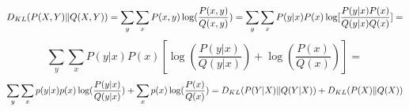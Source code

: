 \begin{answer}
$$ D_{KL}(P(X,Y)\|Q(X,Y)) = \sum_y \sum_x P(x,y) \log(\frac{P(x,y)}{Q(x,y)}) = \sum_y \sum_x P(y|x)P(x) \log[\frac{P(y|x)P(x)}{Q(y|x)Q(x)}] = $$
$$\sum_y \sum_x P(y|x)P(x) [\log(\frac{P(y|x)}{Q(y|x)}) + \log(\frac{P(x)}{Q(x)})] = $$
$$\sum_y \sum_x p(y|x)p(x)\log(\frac{P(y|x)}{Q(y|x)}) + \sum_x p(x) \log(\frac{P(x)}{Q(x)}) =  D_{KL}(P(Y|X)\|Q(Y|X)) + D_{KL}(P(X)\|Q(X)) $$
\end{answer}
